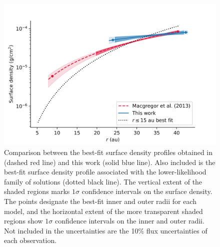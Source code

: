 \documentclass[modern]{aastex62}
\begin{document}
\begin{figure}
  \includegraphics[width=\linewidth]{../figures/surface_density}
  \caption{
    Comparison between the best-fit surface density profiles obtained in \cite{macgregor13} (dashed red line) and this work (solid blue line).
    Also included is the best-fit surface density profile associated with the lower-likelihood family of solutions (dotted black line).
    The vertical extent of the shaded regions marks $1\sigma$ confidence intervals on the surface density. 
    The points designate the best-fit inner and outer radii for each model, and the horizontal extent of the more transparent shaded regions show $1 \sigma$ confidence intervals on the inner and outer radii.
    Not included in the uncertainties are the 10\% flux uncertainties of each observation.
    }
  \label{fig surface_density}
\end{figure}
\end{document}
